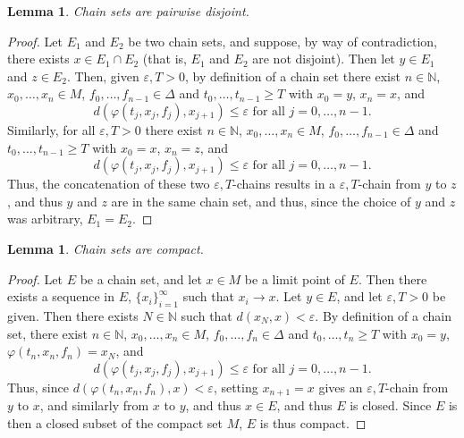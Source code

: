 \documentclass[11pt]{article}
\newtheorem{lem}[thm]{Lemma}
\begin{document}
\begin{lem}\label{chaindisjoint}
Chain sets are pairwise disjoint.
\end{lem}
\begin{proof}
Let $E_1$ and $E_2$ be two chain sets, and suppose, by way of contradiction, there exists $x\in E_1\cap E_2$ (that is, $E_1$ and $E_2$ are not disjoint).  Then let $y\in E_1$ and $z\in E_2$.  Then, given $\varepsilon, T>0$, by definition of a chain set there exist $n\in\mathbb{N}$, $x_0,\ldots,x_n\in M$, $f_0,\ldots,f_{n-1}\in\Delta$ and $t_0,\ldots,t_{n-1}\geq T$ with $x_0=y$, $x_n=x$, and 
$$d(\varphi(t_j,x_j,f_j),x_{j+1})\leq\varepsilon\mbox{ for all }j=0,\ldots,n-1.$$  Similarly, for all $\varepsilon, T>0$ there exist $n\in\mathbb{N}$, $x_0,\ldots,x_n\in M$, $f_0,\ldots,f_{n-1}\in\Delta$ and $t_0,\ldots,t_{n-1}\geq T$ with $x_0=x$, $x_n=z$, and 
$$d(\varphi(t_j,x_j,f_j),x_{j+1})\leq\varepsilon\mbox{ for all }j=0,\ldots,n-1.$$
Thus, the concatenation of these two $\varepsilon, T$-chains results in a $\varepsilon, T$-chain from $y$ to $z$, and thus $y$ and $z$ are in the same chain set, and thus, since the choice of $y$ and $z$ was arbitrary, $E_1=E_2$.  
\end{proof}

\begin{lem}  \label{compact}
Chain sets are compact.
\end{lem}
\begin{proof}
Let $E$ be a chain set, and let $x\in M$ be a limit point of $E$.  Then there exists a sequence in $E$, $\{x_i\}_{i=1}^\infty$ such that $x_i\rightarrow x$.  Let $y\in E$, and let $\varepsilon, T>0$ be given.  Then there exists $N\in\mathbb{N}$ such that $d(x_N,x)<\varepsilon$.  By definition of a chain set, there exist $n\in\mathbb{N}$, $x_0,\ldots,x_n\in M$, $f_0,\ldots,f_{n}\in\Delta$ and $t_0,\ldots,t_{n}\geq T$ with $x_0=y$, $\varphi(t_n,x_n,f_n)=x_N$, and 
$$d(\varphi(t_j,x_j,f_j),x_{j+1})\leq\varepsilon\mbox{ for all }j=0,\ldots,n-1.$$  
Thus, since $d(\varphi(t_n,x_n,f_n),x)<\varepsilon$, setting $x_{n+1}=x$ gives an $\varepsilon, T$-chain from $y$ to $x$, and similarly from $x$ to $y$, and thus $x\in E$, and thus $E$ is closed.  Since $E$ is then a closed subset of the compact set $M$, $E$ is thus compact. 
\end{proof}
\end{document}
